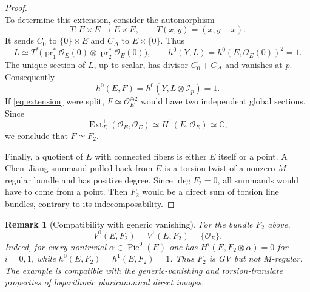 \documentclass[11pt,letterpaper]{article}
\theoremstyle{paper}
\newtheorem{remark}[theorem]{Remark}
\newcommand{\OO}{\mathcal O}
\newcommand{\II}{\mathcal I}
\newcommand{\CC}{\mathbb C}
\DeclareMathOperator{\Pic}{Pic}
\DeclareMathOperator{\pr}{pr}
\DeclareMathOperator{\Ext}{Ext}
\begin{document}
\begin{proof}
\begin{equation}
\end{equation}
To determine this extension, consider the automorphism
\[
T:E\times E\longrightarrow E\times E,\qquad T(x,y)=(x,y-x).
\]
It sends $C_0$ to $\{0\}\times E$ and $C_\Delta$ to $E\times\{0\}$. Thus
\[
L\simeq T^*\bigl(\pr_1^*\OO_E(0)\otimes\pr_2^*\OO_E(0)\bigr),
\qquad h^0(Y,L)=h^0(E,\OO_E(0))^2=1.
\]
The unique section of $L$, up to scalar, has divisor $C_0+C_\Delta$ and vanishes at $p$. Consequently
\[
h^0(E,F)=h^0(Y,L\otimes\II_p)=1.
\]
If \eqref{eq:extension} were split, $F\simeq\OO_E^{\oplus2}$ would have two independent global sections. Since
\[
\Ext^1_E(\OO_E,\OO_E)\simeq H^1(E,\OO_E)\simeq\CC,
\]
we conclude that $F\simeq F_2$.

Finally, a quotient of $E$ with connected fibers is either $E$ itself or a point. A Chen--Jiang summand pulled back from $E$ is a torsion twist of a nonzero $M$-regular bundle and has positive degree. Since $\deg F_2=0$, all summands would have to come from a point. Then $F_2$ would be a direct sum of torsion line bundles, contrary to its indecomposability.
\end{proof}

\begin{remark}[Compatibility with generic vanishing]\label{rem:F2loci}
For the bundle $F_2$ above,
\[
V^0(E,F_2)=V^1(E,F_2)=\{\OO_E\}.
\]
Indeed, for every nontrivial $\alpha\in\Pic^0(E)$ one has $H^i(E,F_2\otimes\alpha)=0$ for $i=0,1$, while $h^0(E,F_2)=h^1(E,F_2)=1$. Thus $F_2$ is GV but not $M$-regular. The example is compatible with the generic-vanishing and torsion-translate properties of logarithmic pluricanonical direct images.
\end{remark}
\end{document}
